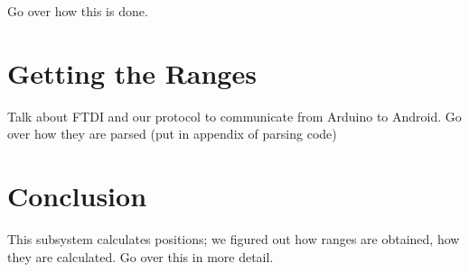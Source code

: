 Go over how this is done.

\section{Getting the Ranges}
Talk about FTDI and our protocol to communicate from Arduino to Android. Go over how they are parsed (put in appendix of parsing code)

\section{Conclusion}
This subsystem calculates positions; we figured out how ranges are obtained, how they are calculated. Go over this in more detail.

